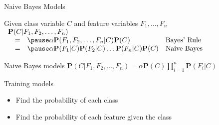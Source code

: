 \documentclass[14pt]{beamer}
\begin{document}
\begin{frame}{Naive Bayes Models}
	\begin{block}{Given class variable $C$ and feature variables $F_1,\ldots,F_n$}
		$
		\begin{array}{llll}
			\lefteqn{\mathbf{P}(C|F_1,F_2,\ldots,F_n)} \\
			& = & \pause\alpha\mathbf{P}(F_1,F_2,\ldots,F_n|C)\mathbf{P}(C) & \mbox{Bayes' Rule} \\
			& = & \pause\alpha\mathbf{P}(F_1|C)\mathbf{P}(F_2|C)\ldots\mathbf{P}(F_n|C)\mathbf{P}(C) & \mbox{Naive Bayes}
		\end{array}
		$
	\end{block}
	\pause
	\vspace{-1pt}
	\begin{block}{Naive Bayes models}
		$\mathbf{P}(C|F_1,F_2,\ldots,F_n) = \alpha\mathbf{P}(C)\prod\limits_{i=1}^{n}\mathbf{P}(F_{i}|C)$
	\end{block}
	\pause
	\vspace{-1pt}
	\begin{block}{Training models}
		\begin{itemize}
			\item Find the probability of each class
			\item Find the probability of each feature given the class
		\end{itemize}
	\end{block}
\end{frame}
\end{document}
